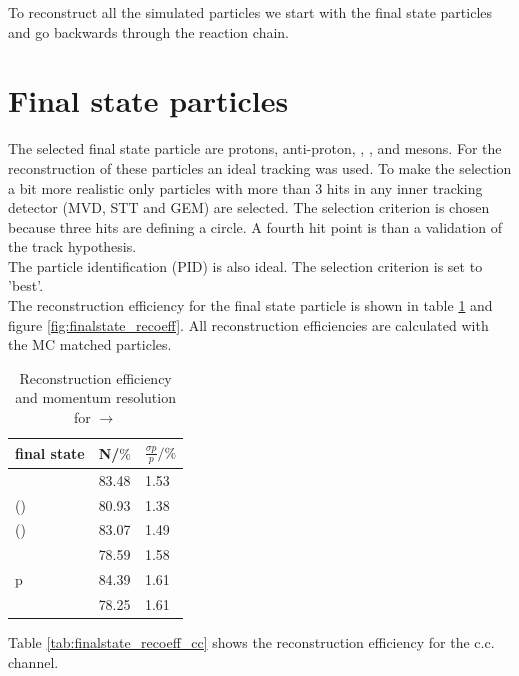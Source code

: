 To reconstruct all the simulated particles we start with the final state particles and go backwards through the reaction chain.

\section{Final state particles}
	The selected final state particle are protons, anti-proton, \piminus, \piplus, \kminus and \kplus mesons.
	For the reconstruction of these particles an ideal tracking was used. 
	To make the selection a bit more realistic only particles with more than 3 hits in any inner tracking detector (MVD, STT and GEM)
	are selected.
	The selection criterion is chosen because three hits are defining a circle.
	A fourth hit point is than a validation of the track hypothesis.\\
	The particle identification (PID) is also ideal. 
	The selection criterion is set to 'best'.\vspace{11pt} \\
	The reconstruction efficiency for the final state particle is shown in table \ref{tab:finalstate_recoeff} and figure \ref{fig:finalstate_recoeff}.
	All reconstruction efficiencies are calculated with the MC matched particles.
	
	\begin{table}
		\centering
		\caption{\propose Reconstruction efficiency and momentum resolution for \pbarpSystem $\rightarrow$ \excitedcascade \anticascade}
		\label{tab:finalstate_recoeff}
		\begin{tabular}{lll}
			\hline
			final state & N/$\%$ & $\frac{\sigma p}{p}/\%$ \\
			\hline
			\hline
			\piminus & 83.48 & 1.53\\
			\piplusone(\anticascade) &  80.93& 1.38 \\
			\piplustwo(\alam) &  83.07& 1.49\\
			\kminus&  78.59& 1.58\\
			p &  84.39& 1.61\\
			\antiproton & 78.25 & 1.61\\\hline
			 
		\end{tabular}
	\end{table}
	
	Table \ref{tab:finalstate_recoeff_cc} shows the reconstruction efficiency for the c.c. channel.
	
